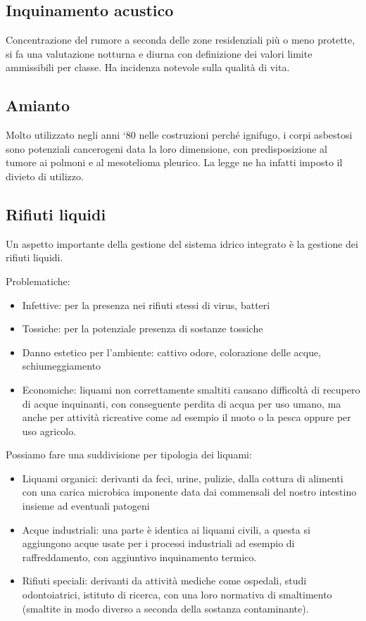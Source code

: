 \subsection{Inquinamento acustico}

Concentrazione del rumore a seconda delle zone residenziali più o meno
protette, si fa una valutazione notturna e diurna con definizione dei
valori limite ammissibili per classe. Ha incidenza notevole sulla
qualità di vita.

\subsection{Amianto}

Molto utilizzato negli anni `80 nelle costruzioni perché ignifugo, i
corpi asbestosi sono potenziali cancerogeni data la loro dimensione, con
predisposizione al tumore ai polmoni e al mesotelioma pleurico. La legge
ne ha infatti imposto il divieto di utilizzo.

\subsection{Rifiuti liquidi}

Un aspetto importante della gestione del sistema idrico integrato è la
gestione dei rifiuti liquidi.

Problematiche:

\begin{itemize}
\item
  Infettive: per la presenza nei rifiuti stessi di virus, batteri
\item
  Tossiche: per la potenziale presenza di sostanze tossiche
\item
  Danno estetico per l'ambiente: cattivo odore, colorazione delle acque,
  schiumeggiamento
\item
  Economiche: liquami non correttamente smaltiti causano difficoltà di
  recupero di acque inquinanti, con conseguente perdita di acqua per uso
  umano, ma anche per attività ricreative come ad esempio il nuoto o la
  pesca oppure per uso agricolo.
\end{itemize}

Possiamo fare una suddivisione per tipologia dei liquami:

\begin{itemize}
\item
  Liquami organici: derivanti da feci, urine, pulizie, dalla cottura di
  alimenti con una carica microbica imponente data dai commensali del
  nostro intestino insieme ad eventuali patogeni
\item
  Acque industriali: una parte è identica ai liquami civili, a questa si
  aggiungono acque usate per i processi industriali ad esempio di
  raffreddamento, con aggiuntivo inquinamento termico.
\item
  Rifiuti speciali: derivanti da attività mediche come ospedali, studi
  odontoiatrici, istituto di ricerca, con una loro normativa di
  smaltimento (smaltite in modo diverso a seconda della sostanza
  contaminante).
\end{itemize}

